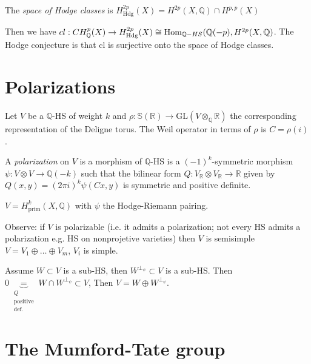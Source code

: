 \begin{definition}
\label{definition-space-of-hodge-classes}
The {\it space of Hodge classes}
is $H^{2p}_{\text{Hdg}}(X)
=H^{2p}(X,\mathbb{Q})
\cap H^{p,p}(X)$
\end{definition}



\noindent
Then we have
$cl:CH^p_{\mathbb{Q}}(X)
\to H^{2p}_{\text{Hdg}}(X)
\cong
\mathop{\mathrm{Hom}}\nolimits_{\mathbb{Q}-HS}(\mathbb{Q}(-p),H^{2p}(X,
\mathbb{Q})$.
The Hodge conjecture is that cl
is surjective onto the space of Hodge
classes.

\section{Polarizations}
\label{section-polarizations}

\noindent
Let $V$ be a $\mathbb{Q}$-HS of weight $k$
and $\rho:\mathbb{S}(\mathbb{R})\to
\text{GL}(V\otimes_{\mathbb{Q}}\mathbb{R})$
the corresponding representation of the
Deligne torus.
The Weil operator in terms of $\rho$ is
$C=\rho(i)$.

\begin{definition}
\label{definition-polarization}
A {\it polarization} on $V$ is a morphism
of $\mathbb{Q}$-HS is a $(-1)^k$-symmetric
morphism
$\psi:V \otimes V \to \mathbb{Q}(-k)$
such that the bilinear form
$Q:V_{\mathbb{R}}\otimes V_{\mathbb{R}}\to
\mathbb{R}$
given by $Q(x,y)=(2\pi i)^k\psi(Cx,y)$
is symmetric and positive definite.
\end{definition}

\begin{example}
\label{example-polarization}
$V=H^k_{\text{prim}}(X,\mathbb{Q})$
with $\psi$ the Hodge-Riemann pairing.
\end{example}

\noindent
Observe: if $V$ is polarizable
(i.e. it admits a polarization;
not every HS admits a polarization e.g. HS
on nonprojetive varieties)
then $V$ is semisimple
$V=V_1 \oplus  … \oplus  V_m$,
$V_i$ is simple.

Assume $W \subset V$ is a sub-HS,
then $W^{\perp_\psi} \subset V$
is a sub-HS.
Then
$0 \underbrace{=}_{\substack{Q \\
\text{positive}\\\text{def.}}}
W \cap W^{\perp_\psi} \subset V$,
Then $V=W \oplus  W^{\perp_\psi}$.

\section{The Mumford-Tate group}
\label{section-mumford-tate-group}

